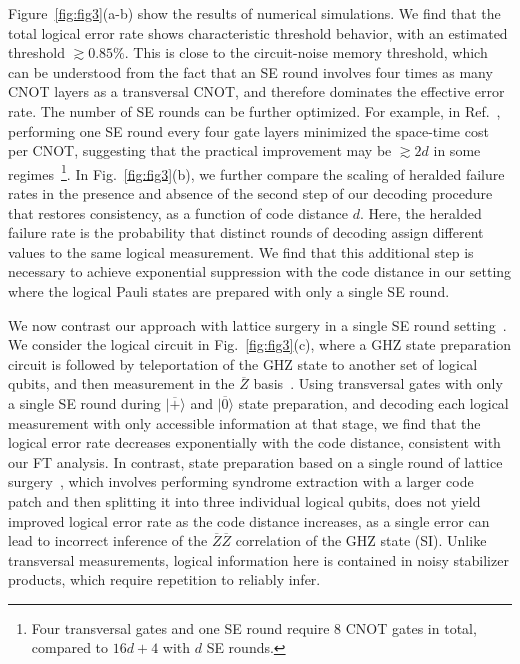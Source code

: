 \documentclass[prl,twocolumn,superscriptaddress,secnumarabic,balancelastpage,amsmath,amssymb]{revtex4-2}
\newcommand{\lket}[1]{|{\overline{#1}}\rangle}
\begin{document}
Figure~\ref{fig:fig3}(a-b) show the results of numerical simulations. 
%
We find that the total logical error rate shows characteristic threshold behavior, with an estimated threshold $\gtrsim 0.85\%$.
%
This is close to the circuit-noise memory threshold, which can be understood from the fact that an SE round involves four times as many CNOT layers as a transversal CNOT, and therefore dominates the effective error rate.
%
The number of SE rounds can be further optimized.
For example, in Ref.~\cite{cain2024correlated}, performing one SE round every four gate layers minimized the space-time cost per CNOT, suggesting that the practical improvement may be $\gtrsim 2d$ in some regimes~\footnote{Four transversal gates and one SE round require 8 CNOT gates in total, compared to $16d+4$ with $d$ SE rounds.}.
%
In Fig.~\ref{fig:fig3}(b), we further compare the scaling of heralded failure rates in the presence and absence of the second step of our decoding procedure that restores consistency, as a function of code distance $d$.
%
Here, the heralded failure rate is the probability that distinct rounds of decoding assign different values to the same logical measurement.
%
We find that this additional step is necessary to achieve exponential suppression with the code distance in our setting where the logical Pauli states are prepared with only a single SE round.

We now contrast our approach with lattice surgery in a single SE round setting~\cite{horsman2012surface,litinski2019game,kim2022fault,fowler2018low}.
%
We consider the logical circuit in Fig.~\ref{fig:fig3}(c), where a GHZ state preparation circuit is followed by teleportation of the GHZ state to another set of logical qubits, and then measurement in the $\overline{Z}$ basis~\cite{SM}.
%
Using transversal gates with only a single SE round during $\lket{+}$ and $\lket{0}$ state preparation, and decoding each logical measurement with only accessible information at that stage, we find that the logical error rate decreases exponentially with the code distance, consistent with our FT analysis.
%
In contrast, state preparation based on a single round of lattice surgery~\cite{kim2022fault}, which involves performing syndrome extraction with a larger code patch and then splitting it into three individual logical qubits, does not yield improved logical error rate as the code distance increases, as a single error can lead to incorrect inference of the $\overline{Z}\overline{Z}$ correlation of the GHZ state (SI).
%
Unlike transversal measurements, logical information here is contained in noisy stabilizer products, which require repetition to reliably infer.
\end{document}

